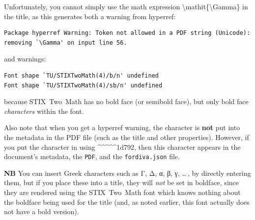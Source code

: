 \documentclass[12pt, twoside]{article}
\newcommand{\fname}[1]{\texttt{#1}}
\begin{document}
Unfortunately, you cannot simply use the math expression \textbackslash mathit\{\textbackslash Gamma\}  in the title, as this generates both a warning from hyperref:
\begin{lstlisting}[basicstyle=\scriptsize,breaklines=true, postbreak=\usebox{\lstbreakbox}]
Package hyperref Warning: Token not allowed in a PDF string (Unicode): removing `\Gamma' on input line 56.
\end{lstlisting}
\noindent and warnings:
\begin{Verbatim}[breaklines=true]
Font shape `TU/STIXTwoMath(4)/b/n' undefined
Font shape `TU/STIXTwoMath(4)/sb/n' undefined
\end{Verbatim}
because \gls{STIX}~Two~Math has no bold face (or semibold face), but only bold face \textit{characters} within the font.

Also note that when you get a hyperref warning, the character is \textbf{not} put into the metadata in the \gls{PDF} file (such as the title and other properties). However, if you put the character in using \textasciicircum\textasciicircum\textasciicircum\textasciicircum\textasciicircum1d792, then this character appears in the document's metadata, the \texttt{PDF}, and the \fname{fordiva.json} file.

\textbf{NB} You can insert Greek characters such as Γ, Δ, α, β, γ, \ldots\,, by directly entering them, but if you place these into a title, they will \textit{not} be set in boldface, since they are rendered using the \gls{STIX}~Two~Math font which knows nothing about the boldface being used for the title (and, as noted earlier, this font actually does not have a bold version).
\end{document}
